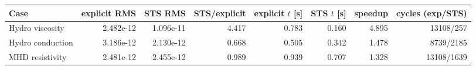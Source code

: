 \begin{tabular}{lrrrrrrr}
\toprule
Case & explicit RMS & STS RMS & STS/explicit & explicit $t$ [s] & STS $t$ [s] & speedup & cycles (exp/STS) \\
\midrule
Hydro viscosity & 2.482e-12 & 1.096e-11 & 4.417 & 0.783 & 0.160 & 4.895 & 13108/257 \\
Hydro conduction & 3.186e-12 & 2.130e-12 & 0.668 & 0.505 & 0.342 & 1.478 & 8739/2185 \\
MHD resistivity & 2.481e-12 & 2.455e-12 & 0.989 & 0.939 & 0.707 & 1.328 & 13108/1639 \\
\bottomrule
\end{tabular}

